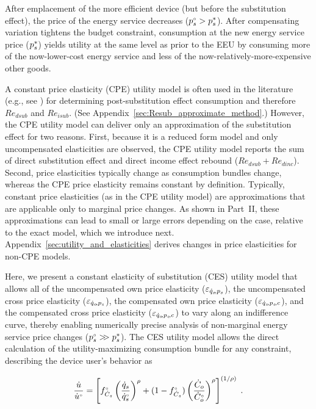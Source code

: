 \documentclass[12pt]{article}\usepackage[]{graphicx}\usepackage[]{xcolor}
\begin{document}
After emplacement of the more efficient device
(but before the substitution effect), 
the price of the energy service decreases (${}{p}^{\scriptscriptstyle \circ}_s > {p}^*_s$).
After compensating variation tightens the budget constraint,
consumption at the new energy service price (${p}^*_s$)
yields utility at the same level as prior to the EEU
by consuming more of the now-lower-cost energy service
and less of the now-relatively-more-expensive other goods.

A constant price elasticity (CPE) utility model
is often used in the literature
(e.g., see \citet[p.~17, footnote~43]{Borenstein:2015aa})
for determining  post-substitution effect consumption 
and therefore $Re_{dsub}$ and $Re_{isub}$.
(See Appendix~\ref{sec:Resub_approximate_method}.)
However, the CPE utility model can deliver 
only an approximation of the substitution effect for two reasons. 
First, because it is a reduced form model and 
only uncompensated elasticities are observed, 
the CPE utility model reports the sum of 
direct substitution effect
and direct income effect rebound
($Re_{dsub} + Re_{dinc}$). 
Second, price elasticities
typically change as consumption bundles change, 
whereas the CPE price elasticity remains constant by definition.
Typically, constant price elasticities (as in the CPE utility model) 
are approximations that are applicable only to marginal price changes. 
As shown in Part~II, 
these approximations can lead to small
or large errors depending on the case, 
relative to the exact model,
which we introduce next.
Appendix~\ref{sec:utility_and_elasticities}
derives changes in price elasticities for non-CPE models.

Here, we present a
constant elasticity of substitution (CES) utility model
that allows all of
the uncompensated own price elasticity ($\varepsilon_{\dot{q}_s\!,p_s}$),
the uncompensated cross price elasticity ($\varepsilon_{\dot{q}_o\!,p_s}$),
the compensated own price elasticity ($\varepsilon_{\dot{q}_s\!,p_s\!,c}$), and
the compensated cross price elasticity ($\varepsilon_{\dot{q}_o\!,p_s\!,c}$)
to vary along an indifference curve, 
thereby enabling numerically precise analysis 
of non-marginal energy service price changes 
(${}{p}^{\scriptscriptstyle \circ}_s >\!\!> {p}^*_s$). 
The CES utility model allows the direct calculation
of the utility-maximizing consumption bundle for any constraint,
describing the device user's behavior as

\begin{equation} \label{eq:ces_utility}
  \frac{\dot{u}}{{}{\dot{u}}^{\scriptscriptstyle \circ}} = \left[ {}{f}^{\scriptscriptstyle \circ}_{\dot{C}_s} \left( \frac{\dot{q}_s}{{}{\dot{q}}^{\scriptscriptstyle \circ}_s} \right)^\rho + (1-{}{f}^{\scriptscriptstyle \circ}_{\dot{C}_s}) \left( \frac{\dot{C}_o}{{}{\dot{C}}^{\scriptscriptstyle \circ}_o} \right)^\rho \right]^{(1/\rho)}{} \; .
\end{equation}
\end{document}
